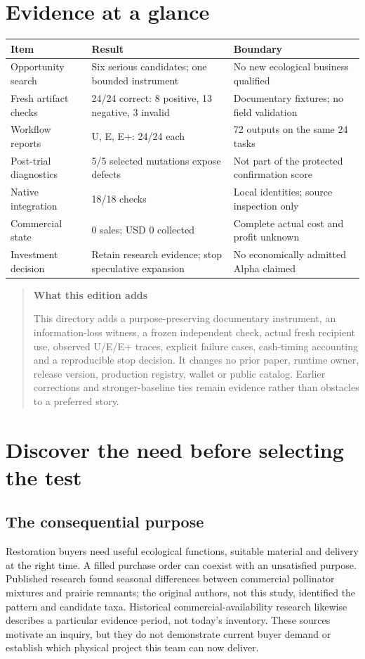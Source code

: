 \documentclass[11pt]{article}
\begin{document}
\section*{Evidence at a glance}
\begin{tabularx}{\textwidth}{@{}lY Y@{}}
\toprule
Item & Result & Boundary\\\midrule
Opportunity search & Six serious candidates; one bounded instrument & No new ecological business qualified\\
Fresh artifact checks & 24/24 correct: 8 positive, 13 negative, 3 invalid & Documentary fixtures; no field validation\\
Workflow reports & U, E, E+: 24/24 each & 72 outputs on the same 24 tasks\\
Post-trial diagnostics & 5/5 selected mutations expose defects & Not part of the protected confirmation score\\
Native integration & 18/18 checks & Local identities; source inspection only\\
Commercial state & 0 sales; USD 0 collected & Complete actual cost and profit unknown\\
Investment decision & Retain research evidence; stop speculative expansion & No economically admitted Alpha claimed\\
\bottomrule
\end{tabularx}

\endgroup
\clearpage
\setcounter{tocdepth}{1}

\vspace{8mm}
\begin{quote}
\textbf{What this edition adds}


This directory adds a purpose-preserving documentary instrument, an information-loss witness, a frozen independent check, actual fresh recipient use, observed U/E/E+ traces, explicit failure cases, cash-timing accounting and a reproducible stop decision. It changes no prior paper, runtime owner, release version, production registry, wallet or public catalog. Earlier corrections and stronger-baseline ties remain evidence rather than obstacles to a preferred story.
\end{quote}

\section{Discover the need before selecting the test}
\subsection{The consequential purpose}
Restoration buyers need useful ecological functions, suitable material and delivery at the right time. A filled purchase order can coexist with an unsatisfied purpose. Published research found seasonal differences between commercial pollinator mixtures and prairie remnants; the original authors, not this study, identified the pattern and candidate taxa. Historical commercial-availability research likewise describes a particular evidence period, not today's inventory. These sources motivate an inquiry, but they do not demonstrate current buyer demand or establish which physical project this team can now deliver.\cite{zinnen,availability}
\end{document}
